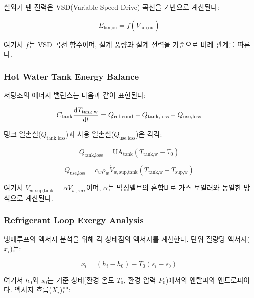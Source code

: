 \documentclass[final,5p,times,twocolumn,authoryear]{elsarticle}
\begin{document}
실외기 팬 전력은 VSD(Variable Speed Drive) 곡선을 기반으로 계산된다:

\begin{equation}
\label{eq:hpb_e_fan}
E_{\text{fan,ou}} = f(\dot{V}_{\text{fan,ou}})
\end{equation}

여기서 $f$는 VSD 곡선 함수이며, 설계 풍량과 설계 전력을 기준으로 비례 관계를 따른다.

\subsubsection{Hot Water Tank Energy Balance}

저탕조의 에너지 밸런스는 다음과 같이 표현된다:

\begin{equation}
\label{eq:hpb_tank_energy}
C_{\text{tank}} \frac{{\rm d}T_{\text{tank,w}}}{{\rm d}t} = Q_{\text{ref,cond}} - Q_{\text{tank,loss}} - Q_{\text{use,loss}}
\end{equation}

탱크 열손실($Q_{\text{tank,loss}}$)과 사용 열손실($Q_{\text{use,loss}}$)은 각각:

\begin{equation}
\label{eq:hpb_q_tank_loss}
Q_{\text{tank,loss}} = \text{UA}_{\text{tank}} (T_{\text{tank,w}} - T_0)
\end{equation}

\begin{equation}
\label{eq:hpb_q_use_loss}
Q_{\text{use,loss}} = c_w \rho_w \dot{V}_{w,\text{sup,tank}} (T_{\text{tank,w}} - T_{\text{sup,w}})
\end{equation}

여기서 $\dot{V}_{w,\text{sup,tank}} = \alpha \dot{V}_{w,\text{serv}}$이며, $\alpha$는 믹싱밸브의 혼합비로 가스 보일러와 동일한 방식으로 계산된다.

\subsubsection{Refrigerant Loop Exergy Analysis}

냉매루프의 엑서지 분석을 위해 각 상태점의 엑서지를 계산한다. 단위 질량당 엑서지($x_i$)는:

\begin{equation}
\label{eq:hpb_exergy_states}
x_i = (h_i - h_0) - T_0(s_i - s_0)
\end{equation}

여기서 $h_0$와 $s_0$는 기준 상태(환경 온도 $T_0$, 환경 압력 $P_0$)에서의 엔탈피와 엔트로피이다. 엑서지 흐름($X_i$)은:
\end{document}
